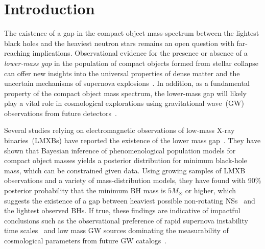 \documentclass[modern]{aastex631}
\begin{document}
\section{Introduction}
\label{sec:intro}

The existence of a gap in the compact object mass-spectrum between the lightest black holes and the heaviest neutron stars remains an open question with far-reaching implications. Observational evidence for the presence or absence of a \textit{lower-mass gap} in the population of compact objects formed from stellar collapse can offer new insights into the universal properties of dense matter and the uncertain mechanisms of supernova explosions~\citep{Fryer:2011cx, Mandel:2020qwb, Zevin:2020gma, Liu:2020uba, Patton:2021gwh, Siegel:2022gwc}. In addition, as a fundamental property of the compact object mass spectrum, the lower-mass gap will likely play a vital role in cosmological explorations using gravitational wave~(GW) observations from future detectors~\citep{Ezquiaga:2022zkx}.

Several studies relying on electromagnetic observations of low-mass X-ray binaries~(LMXBs) have reported the existence of the lower mass gap~\citep{Bailyn:1997xt, Ozel:2010su, Farr:2010tu}. They have shown that Bayesian inference of phenomenological population models for compact object masses yields a posterior distribution for minimum black-hole mass, which can be constrained given data. Using growing samples of LMXB observations and a variety of mass-distribution models, they have found with 90\% posterior probability that the minimum BH mass is $5M_{\odot}$ or higher, which suggests the existence of a gap between heaviest possible non-rotating NSs~\citep[$2-3M_{\odot}$,][]{PhysRevLett.32.324, Kalogera:1996ci, Mueller:1996pm, Ozel:2016oaf, Margalit_2017, Ai:2019rre, Shao:2020bzt, Raaijmakers:2021uju} and the lightest observed BHs. If true, these findings are indicative of impactful conclusions such as the observational preference of rapid supernova instability time scales~\citep[$\sim 10 ms$,][]{Fryer:2011cx, Belczynski:2011bn, Fryer:2022lla, Siegel:2022gwc} and low mass GW sources dominating the measurability of cosmological parameters from future GW catalogs~\citep{Ezquiaga:2022zkx}.
\end{document}
